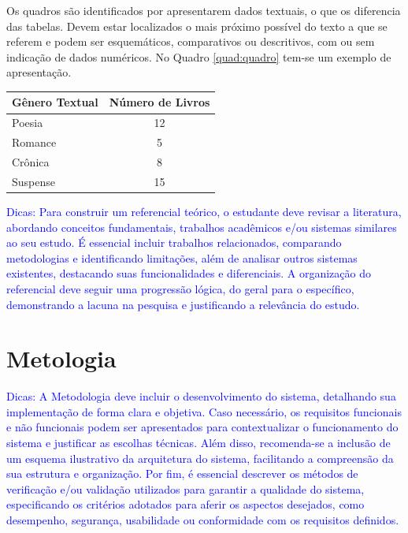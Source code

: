 \documentclass[
	article,			%
	11pt,				%
	oneside,			%
	a4paper,			%
	english,			%
	brazil,				%
	sumario=tradicional
]{abntex2}
\begin{document}
Os quadros são identificados por apresentarem dados textuais, o que os
diferencia das tabelas. Devem estar localizados o mais próximo possível do texto
a que se referem e podem ser esquemáticos, comparativos ou descritivos, com ou
sem indicação de dados numéricos. No Quadro \ref{quad:quadro} tem-se um exemplo
de apresentação.

\begin{square}
    \label{quad:quadro}
    \renewcommand{\arraystretch}{1.2} %
    \setlength{\tabcolsep}{10pt} %
    \begin{tabular}{|l|c|}
        \hline
        \textbf{Gênero Textual} & \textbf{Número de Livros} \\
        \hline
        Poesia   & 12 \\
        \hline
        Romance  & 5  \\
        \hline
        Crônica  & 8  \\
        \hline
        Suspense & 15 \\
        \hline
    \end{tabular}
\end{square}

\textcolor{blue}{
Dicas: Para construir um referencial teórico, o estudante deve revisar a
literatura, abordando conceitos fundamentais, trabalhos acadêmicos e/ou sistemas
similares ao seu estudo. É essencial incluir trabalhos relacionados, comparando
metodologias e identificando limitações, além de analisar outros sistemas
existentes, destacando suas funcionalidades e diferenciais. A organização do
referencial deve seguir uma progressão lógica, do geral para o específico,
demonstrando a lacuna na pesquisa e  justificando a relevância do estudo.
}

\section{Metologia}

\textcolor{blue}{
Dicas: A Metodologia deve incluir o desenvolvimento do sistema, detalhando sua
implementação de forma clara e objetiva. Caso necessário, os requisitos
funcionais e não funcionais podem ser apresentados para contextualizar o
funcionamento do sistema e justificar as escolhas técnicas. Além disso,
recomenda-se a inclusão de um esquema ilustrativo da arquitetura do sistema,
facilitando a compreensão da sua estrutura e organização. Por fim, é essencial
descrever os métodos de verificação e/ou validação utilizados para garantir a
qualidade do sistema, especificando os critérios adotados para aferir os
aspectos desejados, como desempenho, segurança, usabilidade ou conformidade com
os requisitos definidos.
}
\end{document}
